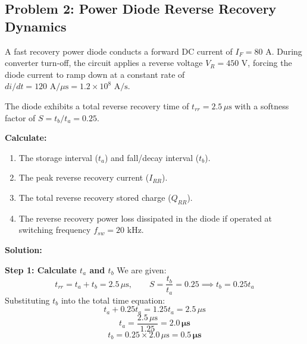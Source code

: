 \documentclass[11pt,a4paper]{article}
\begin{document}
\subsection{Problem 2: Power Diode Reverse Recovery Dynamics}

\begin{examplebox}
A fast recovery power diode conducts a forward DC current of $I_F = 80\text{ A}$. During converter turn-off, the circuit applies a reverse voltage $V_R = 450\text{ V}$, forcing the diode current to ramp down at a constant rate of $di/dt = 120\text{ A}/\mu\text{s} = 1.2 \times 10^8\text{ A/s}$.

The diode exhibits a total reverse recovery time of $t_{rr} = 2.5\,\mu\text{s}$ with a softness factor of $S = t_b / t_a = 0.25$.

\textbf{Calculate:}
\begin{enumerate}[label=(\alph*)]
  \item The storage interval ($t_a$) and fall/decay interval ($t_b$).
  \item The peak reverse recovery current ($I_{RR}$).
  \item The total reverse recovery stored charge ($Q_{RR}$).
  \item The reverse recovery power loss dissipated in the diode if operated at switching frequency $f_{sw} = 20\text{ kHz}$.
\end{enumerate}

\tcblower
\textbf{Solution:}

\textbf{Step 1: Calculate $t_a$ and $t_b$}
We are given:
\begin{equation}
t_{rr} = t_a + t_b = 2.5\,\mu\text{s}, \qquad S = \frac{t_b}{t_a} = 0.25 \implies t_b = 0.25 t_a
\end{equation}
Substituting $t_b$ into the total time equation:
\begin{equation}
t_a + 0.25 t_a = 1.25 t_a = 2.5\,\mu\text{s}
\end{equation}
\begin{equation}
t_a = \frac{2.5\,\mu\text{s}}{1.25} = \mathbf{2.0\,\mu\text{s}}
\end{equation}
\begin{equation}
t_b = 0.25 \times 2.0\,\mu\text{s} = \mathbf{0.5\,\mu\text{s}}
\end{equation}


\end{examplebox}
\end{document}
